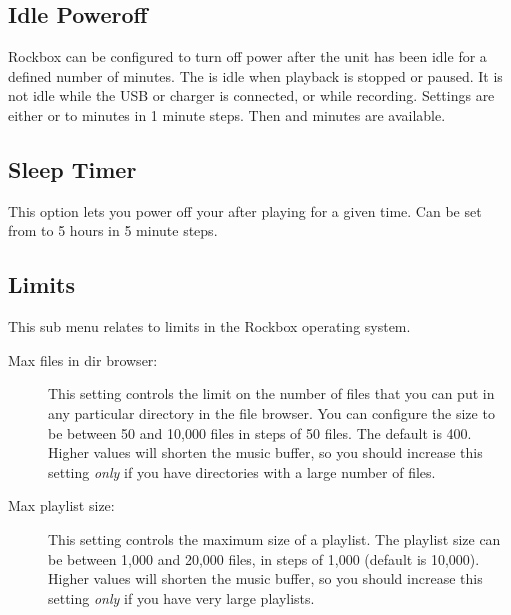 \subsection{Idle Poweroff}
Rockbox can be configured to turn off power after the unit has been idle for a 
defined number of minutes. The \dap{} is idle when playback is stopped or 
paused. It is not idle while the USB or charger is connected, or while 
recording. Settings are either  or  to 
minutes in 1 minute steps. Then  and  minutes are
available.
\subsection{Sleep Timer}
This option lets you power off your \dap{} after playing for a given time. Can
be set from  to 5 hours in 5 minute steps.

\subsection{Limits}
This sub menu relates to limits in the Rockbox operating system.
  \begin{description}
    \item [Max files in dir browser: ]This setting controls the limit on
    the number of files that you can put in any particular directory in the
    file browser. You can configure the size to be between 50 and 10,000 files
    in steps of 50 files. The default is 400. Higher values will shorten the
    music buffer, so you should increase this setting \emph{only} if you have
    directories with a large number of files.

    \item [Max playlist size: ]This setting controls the maximum size of 
    a playlist. The playlist size can be between 1,000 and 20,000 files,
    in steps of 1,000 (default is 10,000). Higher values will shorten the
    music buffer, so you should increase this setting \emph{only} if you
    have very large playlists.
  \end{description}

